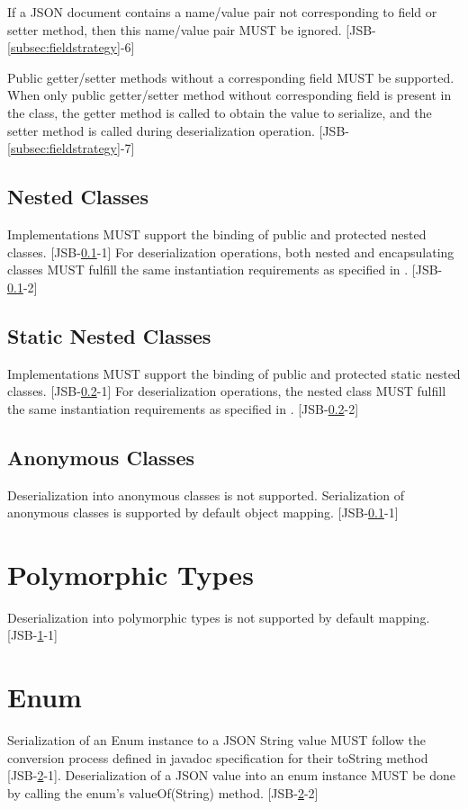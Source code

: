 If a JSON document contains a name/value pair not corresponding to field or setter method, then this name/value pair MUST be ignored. [JSB-\ref{subsec:fieldstrategy}-6]

Public getter/setter methods without a corresponding field MUST be supported. 
When only public getter/setter method without corresponding field is present in the class, the getter method is called to obtain the value to serialize, and the setter method is called during deserialization operation. [JSB-\ref{subsec:fieldstrategy}-7]

\subsection{Nested Classes}
\label{subsec:nestedclass}
Implementations MUST support the binding of public and protected nested classes. [JSB-\ref{subsec:nestedclass}-1] 
For deserialization operations, both nested and encapsulating classes MUST fulfill the same instantiation requirements as specified in . [JSB-\ref{subsec:nestedclass}-2]

\subsection{Static Nested Classes}
\label{subsec:staticnested}
Implementations MUST support the binding of public and protected static nested classes. [JSB-\ref{subsec:staticnested}-1] 
For deserialization operations, the nested class MUST fulfill the same instantiation requirements as specified in . [JSB-\ref{subsec:staticnested}-2]

\subsection{Anonymous Classes}
\label{subsec:anonymous}
Deserialization into anonymous classes is not supported. Serialization of anonymous classes is supported by default object mapping. [JSB-\ref{subsec:nestedclass}-1]

\section{Polymorphic Types}
\label{sec:polymorph}
Deserialization into polymorphic types is not supported by default mapping. [JSB-\ref{sec:polymorph}-1]

\section{Enum}
\label{sec:enum}
Serialization of an Enum instance to a JSON String value 
MUST follow the conversion process defined in javadoc specification for their toString method [JSB-\ref{sec:enum}-1]. 
Deserialization of a JSON value into an enum instance MUST be done by calling the enum's valueOf(String) method. [JSB-\ref{sec:enum}-2]


